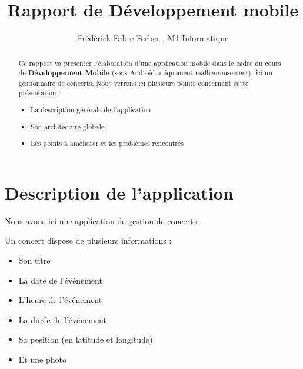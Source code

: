 \documentclass{article}
\title{Rapport de Développement mobile}
\author{Frédérick Fabre Ferber , M1 Informatique}
\begin{document}
\maketitle

\begin{abstract}
Ce rapport va présenter l'élaboration d'une application mobile dans le cadre du cours de \textbf{Développement Mobile} (sous Android uniquement malheureusement), ici un gestionnaire de concerts.
 Nous verrons ici plusieurs points concernant cette présentation :
\begin{itemize}
\item La description générale de l'application
\item Son architecture globale
\item Les points à améliorer et les problèmes rencontrés
\end{itemize}
\end{abstract}

\section{Description de l'application}
\label{section:Description de l'application}

Nous avons ici une application de gestion de concerts. 

Un concert dispose de plusieurs informations :
\begin{itemize}
\item Son titre 
\item La date de l’événement
\item L'heure de l'événement 
\item La durée de l'événement
\item Sa position (en latitude et longitude)
\item Et une photo
\end{itemize}
\end{document}
